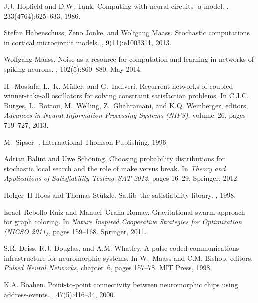 \documentclass[10pt]{article}
\begin{document}
\begin{thebibliography}{10}
J.J. Hopfield and D.W. Tank.
\newblock Computing with neural circuits- a model.
, 233(4764):625--633, 1986.

Stefan Habenschuss, Zeno Jonke, and Wolfgang Maass.
\newblock Stochastic computations in cortical microcircuit models.
, 9(11):e1003311, 2013.

Wolfgang Maass.
\newblock Noise as a resource for computation and learning in networks of
  spiking neurons.
, 102(5):860--880, May 2014.

H.~Mostafa, L.~K. M\"uller, and G.~Indiveri.
\newblock Recurrent networks of coupled winner-take-all oscillators for solving
  constraint satisfaction problems.
\newblock In C.J.C. Burges, L.~Bottou, M.~Welling, Z.~Ghahramani, and K.Q.
  Weinberger, editors, {\em Advances in Neural Information Processing Systems
  ({NIPS})}, volume~26, pages 719--727, 2013.

M.~Sipser.
.
\newblock International Thomson Publishing, 1996.

Adrian Balint and Uwe Sch{\"o}ning.
\newblock Choosing probability distributions for stochastic local search and
  the role of make versus break.
\newblock In {\em Theory and Applications of Satisfiability Testing--SAT 2012},
  pages 16--29. Springer, 2012.

Holger~H Hoos and Thomas St{\"u}tzle.
\newblock Satlib--the satisfiability library.
, 1998.

Israel~Rebollo Ruiz and Manuel~Gra{\~n}a Romay.
\newblock Gravitational swarm approach for graph coloring.
\newblock In {\em Nature Inspired Cooperative Strategies for Optimization
  (NICSO 2011)}, pages 159--168. Springer, 2011.

S.R. Deiss, R.J. Douglas, and A.M. Whatley.
\newblock A pulse-coded communications infrastructure for neuromorphic systems.
\newblock In W.~Maass and C.M. Bishop, editors, {\em Pulsed Neural Networks},
  chapter~6, pages 157--78. MIT Press, 1998.

K.A. Boahen.
\newblock Point-to-point connectivity between neuromorphic chips using
  address-events.
,
  47(5):416--34, 2000.


\end{thebibliography}
\end{document}
